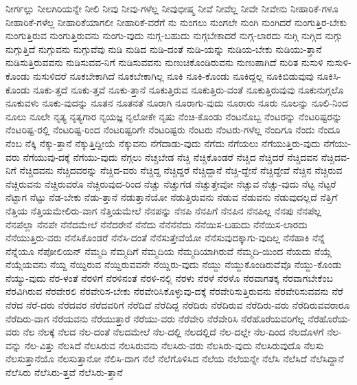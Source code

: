 {ನೀರ್ಗಲ್ಲು
ನೀಲಗಿರಿಯನ್ನೇ
ನೀಲಿ
ನೀವು
ನೀವು-ಗಳೆಲ್ಲ
ನೀವುಭೀಷ್ಮ
ನೀವೆ
ನೀವೆಲ್ಲ
ನೀವೇ
ನೀವೇನು
ನೀಹಾರಿಕೆ-ಗಳೂ
ನೀಹಾರಿಕೆ-ಗಳೆಲ್ಲ
ನೀಹಾರಿಕೆಯಾಗಲೀ
ನೀಹಾರಿಕೆ-ವರೆಗೆ
ನು
ನುಂಗಲು
ನುಂಗಲೇ
ನುಂಗಿ
ನುಂಗಿದರೆ
ನುಂಗುತ್ತಿರ-ಬೇಕು
ನುಂಗುತ್ತಿರುವ
ನುಂಗುತ್ತಿರುವನು
ನುಂಗು-ವುದು
ನುಗ್ಗ-ಬಹುದು
ನುಗ್ಗಬೇಕಾದರೆ
ನುಗ್ಗ-ಲಾರದು
ನುಗ್ಗಿ
ನುಗ್ಗಿದ
ನುಗ್ಗು
ನುಗ್ಗುತ್ತಿದೆ
ನುಗ್ಗುವನು
ನುಗ್ಗುವೆವು
ನುಡಿ
ನುಡಿದ
ನುಡಿ-ದಂತೆ
ನುಡಿ-ಯನ್ನು
ನುಡಿಯ-ಬೇಕು
ನುಡಿಯು-ತ್ತಾನೆ
ನುಡಿಸುತ್ತಿರುವವನು
ನುಡಿಸುವವ-ನಿಗೆ
ನುಡಿಸುವವನು
ನುಣುಚಿಕೊಂಡಿರುವನು
ನುಣುಪಾಗಿದೆ
ನುರಿತ
ನುಸುಳಿ
ನುಸುಳಿ-ಕೊಂಡು
ನುಸುಳಿದರೆ
ನೂಕಬೇಕಾಗಿದೆ
ನೂಕಬೇಕಾಗಿಲ್ಲ
ನೂಕಿ
ನೂಕಿ-ಕೊಂಡು
ನೂಕಿದ್ದಲ್ಲ
ನೂಕಿಬಿಡುವುವು
ನೂಕಿಸಿ-ಕೊಂಡು
ನೂಕು-ತ್ತದೆ
ನೂಕು-ತ್ತವೆ
ನೂಕು-ತ್ತಾನೆ
ನೂಕುತ್ತಿರುವ
ನೂಕುತ್ತಿರು-ವಂತೆ
ನೂಕುತ್ತಿರುವುವು
ನೂಕುನುಗ್ಗಲೊ
ನೂಕುವಳು
ನೂಕು-ವುದನ್ನು
ನೂತನ
ನೂತನತೆ
ನೂರಾಗಿ
ನೂರಾಗು-ವುದು
ನೂರಾರು
ನೂರು
ನೂಲನ್ನು
ನೂಲಿ-ನಿಂದ
ನೂಲು
ನೂಲೇ
ನೃತ್ಯ
ನೃತ್ಯಗಾರ
ನೃಯಜ್ಞ
ನೃಲೋಕೇ
ನೃಷು
ನೆಂಚಿ-ಕೊಂಡು
ನೆಂಟನೊಬ್ಬ
ನೆಂಟರನ್ನು
ನೆಂಟರಿಷ್ಟರನ್ನು
ನೆಂಟರಿಷ್ಟ-ರಲ್ಲಿ
ನೆಂಟರಿಷ್ಟ-ರಿಂದ
ನೆಂಟರಿಷ್ಟರಿಗೇ
ನೆಂಟರಿಷ್ಟರು
ನೆಂಟರು
ನೆಂಟರು-ಗಳೆಲ್ಲ
ನೆಂದಿಗೂ
ನೆಂದು
ನೆಂದೂ
ನೆಂಬ
ನೆಕ್ಕಿ
ನೆಕ್ಕು-ತ್ತಾನೆ
ನೆಕ್ಕುತ್ತಿದ್ದೀಯೆ
ನೆಕ್ಕುವನು
ನೆಗೆದಾಡು-ವುದು
ನೆಗೆದು
ನೆಗೆಯಲು
ನೆಗೆಯುತ್ತಿರು-ವುದು
ನೆಗೆಯು-ವರು
ನೆಗೆಯುವು-ದಕ್ಕೆ
ನೆಗೆಯು-ವುದು
ನೆಗ್ಗಲು
ನೆಚ್ಚಬೇಡ
ನೆಚ್ಚಿ
ನೆಚ್ಚಿಕೊಂಡರೆ
ನೆಚ್ಚಿದ
ನೆಚ್ಚಿದರೆ
ನೆಚ್ಚಿದವನ
ನೆಚ್ಚಿದವ-ನಿಗೆ
ನೆಚ್ಚಿದವನು
ನೆಚ್ಚಿದವರನ್ನು
ನೆಚ್ಚಿದ-ವರು
ನೆಚ್ಚಿದ್ದ
ನೆಚ್ಚಿದ್ದರೆ
ನೆಚ್ಚಿದ್ದಾನೆ
ನೆಚ್ಚಿ-ದ್ದೇನೆ
ನೆಚ್ಚಿದ್ದೇವೆ
ನೆಚ್ಚಿನ
ನೆಚ್ಚಿರುವ
ನೆಚ್ಚಿರುವನು
ನೆಚ್ಚಿರುವರೊ
ನೆಚ್ಚಿರುವುದ-ರಿಂದ
ನೆಚ್ಚು
ನೆಚ್ಚುಗೆಡ
ನೆಚ್ಚುತ್ತೇವೋ
ನೆಚ್ಚುವ
ನೆಚ್ಚು-ವುದು
ನೆಟ್ಟ
ನೆಟ್ಟರೆ
ನೆಟ್ಟಾಗ
ನೆಟ್ಟು
ನೆಡ-ಬೇಕು
ನೆಡು-ತ್ತಾನೆ
ನೆಡುತ್ತಾನೆಯೋ
ನೆಡುತ್ತಿರುವನು
ನೆಡುವ
ನೆಡುವನು
ನೆಡುವುದಲ್ಲದೆ
ನೆತ್ತಿಗೆ
ನೆತ್ತಿಯ
ನೆತ್ತಿಯಮೇಲಿರು-ವಾಗ
ನೆತ್ತಿಯಮೇಲೆ
ನೆನಪನ್ನು
ನೆನಪಿ
ನೆನಪಿಗೆ
ನೆನಪಿನ
ನೆನಪಿಲ್ಲ
ನೆನಪು
ನೆನಪೆಲ್ಲ
ನೆನಪೆಲ್ಲಾ
ನೆನಪೇ
ನೆನೆದಮೇಲೆ
ನೆನೆದರೇನೆ
ನೆನೆದು
ನೆನೆನೆನೆದು
ನೆನೆಯಿಸ-ಬಹುದು
ನೆನೆಯಿಸ-ಲಾರದು
ನೆನೆಯುತ್ತಿರು-ವರು
ನೆನೆಸಿಕೊಂಡರೆ
ನೆನೆಸಿ-ದಂತೆ
ನೆನೆಸುತ್ತೇವೆಯೋ
ನೆನೆಸುವುದಕ್ಕಾಗು-ವುದಿಲ್ಲ
ನೆನೆಹಾಕಿ
ನೆನ್ನೆ
ನೆನ್ನೆಯೂ
ನೆಪೋಲಿಯನ್
ನೆಮ್ಮದಿ
ನೆಮ್ಮದಿಗೆ
ನೆಮ್ಮದಿಯ
ನೆಮ್ಮದಿಯಾಗಿರುವೆ
ನೆಮ್ಮದಿ-ಯಿಂದ
ನೆಯದು
ನೆಯ್ಗೆ
ನೆಯ್ಗೆಯವನು
ನೆಯ್ದ
ನೆಯ್ದಿರುವ
ನೆಯ್ದಿರುವವನೇ
ನೆಯ್ದಿರು-ವುದು
ನೆಯ್ದು
ನೆಯ್ದುಕೊಂಡಿರುವೆವೊ
ನೆಯ್ದು-ಕೊಂಡು
ನೆಯ್ಯು-ವುದು
ನೆರ-ಳಂತೆ
ನೆರಳಿಗೆ
ನೆರಳಿನಂತೆ
ನೆರಳಿ-ನಲ್ಲಿ
ನೆರಳು
ನೆರಳೆ
ನೆರಳೊ
ನೆರವಾಗತಕ್ಕ
ನೆರವಾಗಬೇಕೆಂಬ
ನೆರವಿಗಿರುವ
ನೆರವೇರಲಿ
ನೆರವೇರಿಸ-ಬೇಕು
ನೆರವೇರಿಸಿಕೊಳ್ಳುವು-ದಕ್ಕೆ
ನೆರವೇರಿಸುತ್ತಿರುವನು
ನೆರವೇರಿಸುವವನು
ನೆರೆ
ನೆರೆದ
ನೆರೆ-ದರು
ನೆರೆದವರ
ನೆರೆದವರಿಗೆ
ನೆರೆದಿದೆ
ನೆರೆದಿದ್ದ
ನೆರೆದಿರು
ನೆರೆದಿರುವ
ನೆರೆದಿರು-ವರು
ನೆರೆದಿರುವವರಾರೂ
ನೆರೆದಿರು-ವಾಗ
ನೆರೆಯವನು
ನೆರೆಯುತ್ತಾರೆ
ನೆರೆಯು-ವರು
ನೆರೆವೇರಿ
ನೆರೆವೇರಿಸಿ
ನೆರೆಹೊರೆಯವರಿಗೆಲ್ಲ
ನೆರೆಹೊರೆಯ-ವರು
ನೆಲ
ನೆಲಕ್ಕೆ
ನೆಲದ
ನೆಲ-ದಂತೆ
ನೆಲದಮೇಲೆ
ನೆಲ-ದಲ್ಲಿ
ನೆಲದಲ್ಲಿದೆ
ನೆಲ-ದಲ್ಲೇ
ನೆಲ-ದಿಂದ
ನೆಲದೊಳಗೆ
ನೆಲ-ವನ್ನು
ನೆಲ-ವಿತ್ತು
ನೆಲಸಿದೆ
ನೆಲಸಿರುವ
ನೆಲಸಿರುವನು
ನೆಲಸಿರು-ವರು
ನೆಲಸಿರು-ವುದು
ನೆಲಸಿರುವುದೊ
ನೆಲಸು
ನೆಲಸುತ್ತಾನೆಯೊ
ನೆಲಸುತ್ತಾನೋ
ನೆಲಿಸಿ-ದಾಗ
ನೆಲೆ
ನೆಲೆಗೊಳಿಸಿದ
ನೆಲೆಯ
ನೆಲೆಯನ್ನೇ
ನೆಲೆಸಿ
ನೆಲೆಸಿದೆ
ನೆಲೆಸಿದ್ದಾನೆ
ನೆಲೆಸಿರು
ನೆಲೆಸಿರು-ತ್ತವೆ
ನೆಲೆಸಿರು-ತ್ತಾನೆ
}
